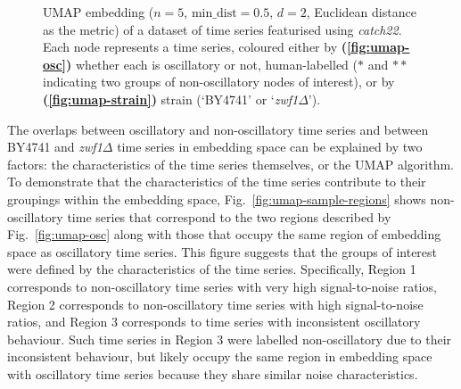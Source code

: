 \begin{figure}
  \caption[
      UMAP embedding of a dataset of time series featurised using \textit{catch22}.
    ]{
      UMAP embedding ($n=5$, $\mathrm{min\_dist} = 0.5$, $d=2$, Euclidean distance as the metric) of a dataset of time series featurised using \textit{catch22}.
      Each node represents a time series, coloured either by
      \textbf{(\ref{fig:umap-osc})}
      whether each is oscillatory or not, human-labelled ($\ast$ and $\ast \ast$ indicating two groups of non-oscillatory nodes of interest), or by
      \textbf{(\ref{fig:umap-strain})}
      strain (`BY4741' or `\textit{zwf1$\Delta$}').
    }
  \label{fig:umap}
\end{figure}

The overlaps between oscillatory and non-oscillatory time series and between BY4741 and \textit{zwf1$\Delta$} time series in embedding space can be explained by two factors: the characteristics of the time series themselves, or the UMAP algorithm.
To demonstrate that the characteristics of the time series contribute to their groupings within the embedding space, Fig.\ \ref{fig:umap-sample-regions} shows non-oscillatory time series that correspond to the two regions described by Fig.\ \ref{fig:umap-osc} along with those that occupy the same region of embedding space as oscillatory time series.
This figure suggests that the groups of interest were defined by the characteristics of the time series.
Specifically, Region 1 corresponds to non-oscillatory time series with very high signal-to-noise ratios, Region 2 corresponds to non-oscillatory time series with high signal-to-noise ratios, and Region 3 corresponds to time series with inconsistent oscillatory behaviour.
Such time series in Region 3 were labelled non-oscillatory due to their inconsistent behaviour, but likely occupy the same region in embedding space with oscillatory time series because they share similar noise characteristics.

